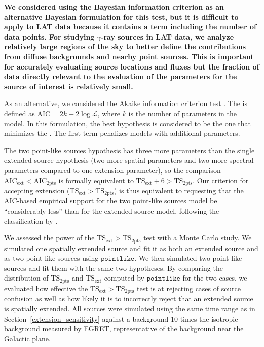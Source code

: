\documentclass[12pt,preprint]{aastex}
\newcommand{\tsext}{{\ensuremath{\text{TS}_{\text{ext}}}}\xspace}
\newcommand{\tsinc}{\ensuremath{\text{TS}_{\text{2pts}}}\xspace}
\newcommand{\likelihood}{\ensuremath{\mathcal{L}}\xspace}
\newcommand{\aic}{\text{AIC}\xspace}
\newcommand{\pointlike}{\ensuremath{\mathtt{pointlike}}\xspace}
\newcommand{\newtext}[1]{{\bfseries \color{red}#1}}
\begin{document}
\newtext{
We considered using 
the Bayesian information criterion \citep[BIC,][]{BIC_statistical_test} as
an alternative Bayesian formulation for this test, but it is difficult to apply
to LAT data because it contains a term including the number of data points. 
For studying $\gamma$-ray sources in LAT data, we analyze relatively large
regions of the sky to better define the contributions from diffuse
backgrounds and nearby point sources. This is important for accurately
evaluating source locations and fluxes but the fraction of data directly
relevant to the evaluation of the parameters for the source of interest
is relatively small.

As an alternative, we considered the Akaike information criterion test \citep[\aic,][]{AIC_statistical_test}.
The \aic is defined as $\aic=2k-2\log\likelihood$, where $k$ is the number of parameters in the model. 
In this formulation, the best hypothesis is considered to be the one that minimizes the \aic.
The first term penalizes models with additional parameters. 

The two point-like sources hypothesis has three more parameters than
the single extended source hypothesis (two more spatial parameters and
two more spectral parameters compared to one extension parameter), so the
comparison $\aic_\text{ext} < \aic_\text{2pts}$  is formally equivalent to
$\tsext + 6 > \tsinc$.  Our criterion for accepting extension ($\tsext > \tsinc$) 
is thus equivalent to requesting that the AIC-based empirical
support for the two point-like sources model be ``considerably less''
than for the extended source model, following the classification by
\cite{aic_stats_book}.
}

We assessed the power of the $\tsext>\tsinc$ test with a Monte Carlo
study.  We simulated one spatially extended source and fit it as both
an extended source and as two point-like sources using \pointlike.
We then simulated two point-like sources and fit them with the same two
hypotheses. By comparing the distribution of \tsinc and \tsext computed by
\pointlike for the two cases, we evaluated how effective the $\tsext>\tsinc$
test is at rejecting cases of source confusion as well as how
likely it is to incorrectly reject that an extended source is spatially
extended.  All sources were simulated using the same time range as in
Section~\ref{extension_sensitivity} against a background 10 times the
isotropic background measured by EGRET, representative of the background
near the Galactic plane.
\end{document}
